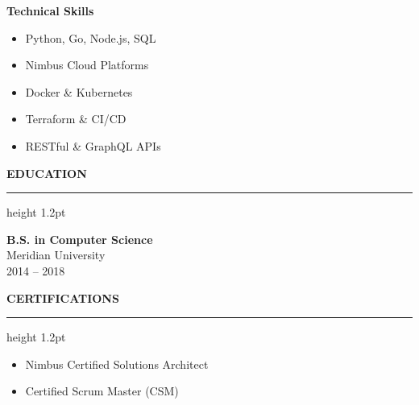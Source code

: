 \documentclass[10pt]{article}
\newcommand{\sectionheader}[1]{%
  \vspace{8pt}%
  {\color{primary}\fontfamily{phv}\selectfont\large\bfseries\MakeUppercase{#1}}%
  \vspace{2pt}%
  {\color{accent}\hrule height 1.2pt}%
  \vspace{4pt}%
}
\begin{document}
\begin{minipage}[t]{0.34\textwidth}
  \vspace{4pt}
  \textbf{Technical Skills}\\
  \begin{itemize}
    \item Python, Go, Node.js, SQL
    \item Nimbus Cloud Platforms
    \item Docker \& Kubernetes
    \item Terraform \& CI/CD
    \item RESTful \& GraphQL APIs
  \end{itemize}

  \sectionheader{Education}
  \textbf{B.S. in Computer Science}\\
  Meridian University\\
  {\color{secondary}\small 2014 -- 2018}

  \sectionheader{Certifications}
  \begin{itemize}
    \item Nimbus Certified Solutions Architect
    \item Certified Scrum Master (CSM)
  \end{itemize}
\end{minipage}
\end{document}
